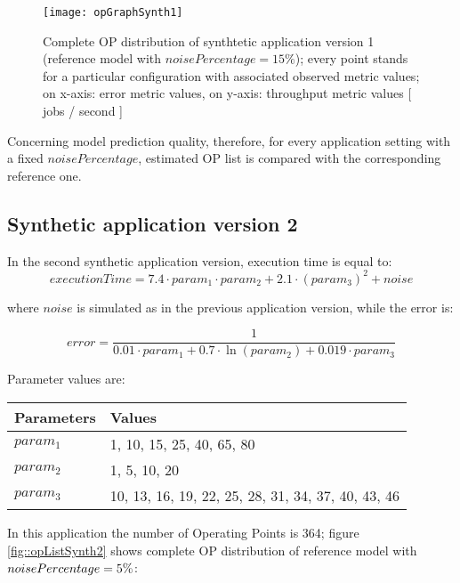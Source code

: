 \begin{figure}[H]

    \centering
    \texttt{[image: opGraphSynth1]}
    \caption{Complete OP distribution of synthtetic application version 1 (reference model with $noisePercentage = 15\%$); every point stands for a particular configuration with associated observed metric values; on x-axis: error metric values, on y-axis: throughput metric values [ jobs / second ]}
    \label{fig::opListSynth1}
    
\end{figure}

Concerning model prediction quality, therefore, for every application setting with a fixed $noisePercentage$, estimated OP list is compared with the corresponding reference one.


\subsection{Synthetic application version 2}

In the second synthetic application version, execution time is equal to:
\[
executionTime = 7.4 \cdot param_1 \cdot param_2 + 2.1 \cdot (param_3)^2 + noise
\]

where $noise$ is simulated as in the previous application version, while the error is:

\[
error = \dfrac{1}{0.01 \cdot param_1 + 0.7 \cdot \ln{(param_2)} + 0.019 \cdot param_3}
\]

Parameter values are:

\begin{center}

    \begin{tabular}{ll}
    
        \toprule
        Parameters & Values \\
        \midrule
        $param_1$ & 1, 10, 15, 25, 40, 65, 80 \\
        $param_2$ & 1, 5, 10, 20 \\
        $param_3$ & 10, 13, 16, 19, 22, 25, 28, 31, 34, 37, 40, 43, 46 \\
        \bottomrule 
    
    \end{tabular}

\end{center}

In this application the number of Operating Points is 364; figure \ref{fig::opListSynth2} shows complete OP distribution of reference model with $noise\-Per\-cent\-age = 5\%$:

